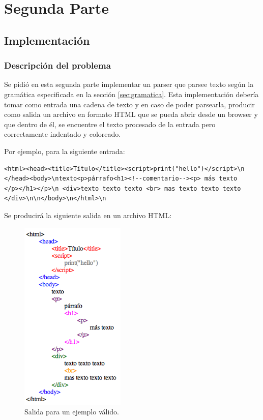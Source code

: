 \section{Segunda Parte}
\subsection{Implementaci\'on}
\subsubsection{Descripci\'on del problema}
Se pidió en esta segunda parte implementar un parser que parsee texto según la gramática especificada en la sección \ref{sec:gramatica}. Esta implementación debería tomar como entrada una cadena de texto y en caso de poder parsearla, producir como salida un archivo en formato HTML que se pueda abrir desde un browser y que dentro de él, se encuentre el texto procesado de la entrada pero correctamente indentado y coloreado.

Por ejemplo, para la siguiente entrada:

      \begin{verbatim}
<html><head><title>Título</title><script>print("hello")</script>\n
</head><body>\ntexto<p>párrafo<h1><!--comentario--><p> más texto
</p></h1></p>\n <div>texto texto texto <br> mas texto texto texto
</div>\n\n</body>\n</html>\n\end{verbatim}

Se producirá la siguiente salida en un archivo HTML:

\begin{figure}[h!]
\includegraphics[width=5cm]{img/ejemplo1.png}
      \caption{Salida para un ejemplo válido.}
      \label{tbl:ejemplo}
\end{figure}

